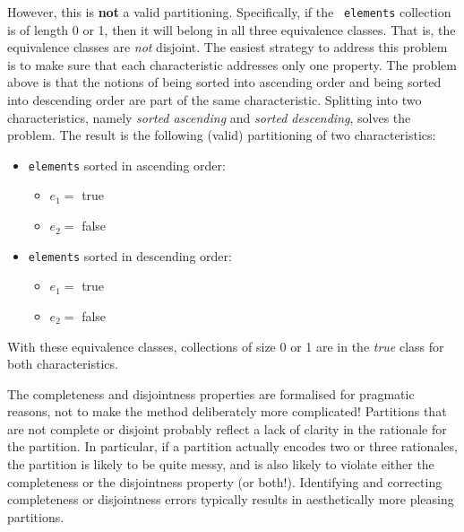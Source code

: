 However, this is {\bf not} a valid partitioning. Specifically, if the {\tt
elements} collection is of length 0 or 1, then it will belong in all three
equivalence classes. That is, the equivalence classes are {\it not} disjoint.
The easiest strategy to address this problem is to make sure that each
characteristic addresses only one property. The problem above is that the
notions of being sorted into ascending order and being sorted into descending
order are part of the same characteristic. Splitting into two characteristics,
namely {\it sorted ascending} and {\it sorted descending}, solves the problem.
The result is the following (valid) partitioning of two characteristics:

\begin{itemize}
    \item {\tt elements} sorted in ascending order:
    \begin{itemize}
        \item $e_1 =$ true
        \item $e_2 =$ false
    \end{itemize}
\end{itemize}

\begin{itemize}
    \item {\tt elements} sorted in descending order:
    \begin{itemize}
        \item $e_1 =$ true
        \item $e_2 =$ false
    \end{itemize}
\end{itemize}

With these equivalence classes, collections of size 0 or 1 are in the {\it true}
class for both characteristics.

The completeness and disjointness properties are formalised for pragmatic
reasons, not to make the method deliberately more complicated!
%
Partitions that are not complete or disjoint probably reflect a lack of clarity
in the rationale for the partition. 
%
In particular, if a partition actually encodes two or three rationales, the
partition is likely to be quite messy, and is also likely to violate either the
completeness or the disjointness property (or both!). Identifying and correcting
completeness or disjointness errors typically results in aesthetically more
pleasing partitions. 
%
%

